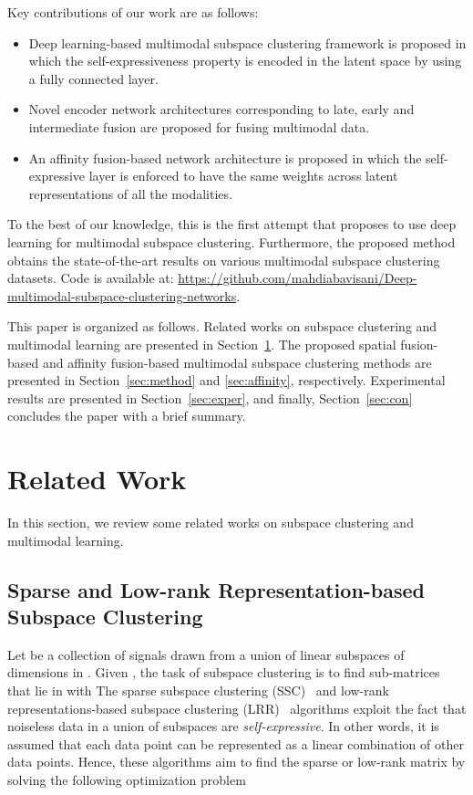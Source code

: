 \documentclass[journal]{IEEEtran}
\begin{document}
Key contributions of our work are as follows:
\begin{itemize}
	\item Deep learning-based multimodal subspace clustering framework is proposed in which the self-expressiveness property is encoded in the latent space by using a fully connected layer.  
	\item Novel encoder network architectures corresponding to late, early and intermediate fusion are proposed for fusing multimodal data. 
	\item An affinity fusion-based network architecture is proposed in which the self-expressive layer is enforced to have the same weights across latent representations of all the modalities.   
	\end{itemize}
To the best of our knowledge, this is the first attempt that proposes to use deep learning for multimodal subspace clustering. Furthermore, the proposed method obtains the state-of-the-art results on various  multimodal subspace clustering datasets.  Code is available at: \url{https://github.com/mahdiabavisani/Deep-multimodal-subspace-clustering-networks}.

This paper is organized as follows. Related works on subspace clustering and multimodal learning are presented in Section~\ref{sec:background}.  The proposed spatial fusion-based and affinity fusion-based multimodal subspace clustering methods are presented in Section~\ref{sec:method} and \ref{sec:affinity}, respectively. Experimental results are presented in Section~\ref{sec:exper}, and finally, Section~\ref{sec:con} concludes the paper with a brief summary. 




 
	 

\section{Related Work}\label{sec:background}
In this section, we review some related works on subspace clustering and multimodal learning.  

\subsection {Sparse and Low-rank Representation-based Subspace Clustering} 
	  Let  be a collection of  signals  drawn from a union of  linear subspaces  of dimensions  in .
  Given , the task of subspace clustering is to find sub-matrices  that lie in  with 
    The sparse subspace clustering (SSC)~\cite{SSC_PAMI} and low-rank representations-based subspace clustering (LRR)~\cite{LRR_PAMI_2013} algorithms exploit the fact that noiseless data in a union of subspaces are \emph{self-expressive}.	In other words, it is assumed that each data point can be represented as a linear combination of other data points. Hence, these algorithms aim to find the sparse or low-rank matrix  by solving the following optimization problem	
\end{document}
